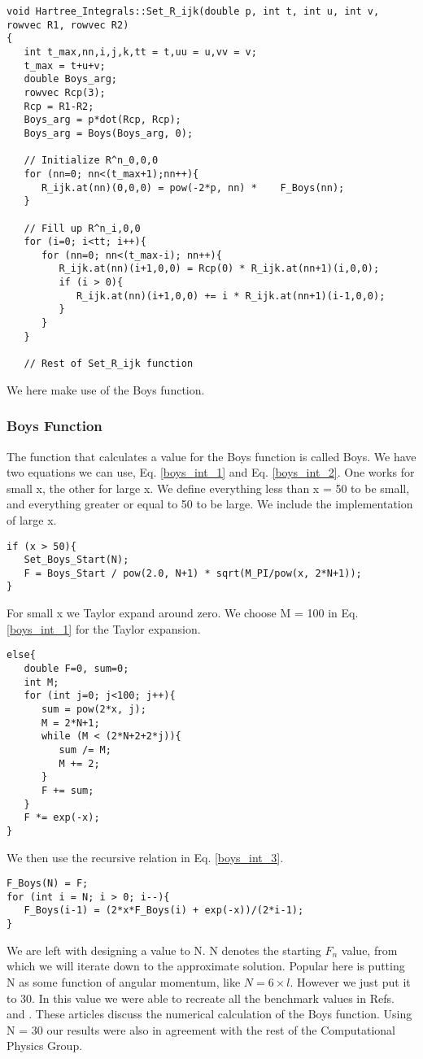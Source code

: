 \begin{lstlisting}
void Hartree_Integrals::Set_R_ijk(double p, int t, int u, int v, rowvec R1, rowvec R2)
{
   int t_max,nn,i,j,k,tt = t,uu = u,vv = v;
   t_max = t+u+v;
   double Boys_arg;
   rowvec Rcp(3);
   Rcp = R1-R2;
   Boys_arg = p*dot(Rcp, Rcp);
   Boys_arg = Boys(Boys_arg, 0);
   
   // Initialize R^n_0,0,0
   for (nn=0; nn<(t_max+1);nn++){
      R_ijk.at(nn)(0,0,0) = pow(-2*p, nn) *    F_Boys(nn);
   }

   // Fill up R^n_i,0,0
   for (i=0; i<tt; i++){
      for (nn=0; nn<(t_max-i); nn++){
         R_ijk.at(nn)(i+1,0,0) = Rcp(0) * R_ijk.at(nn+1)(i,0,0);
         if (i > 0){
            R_ijk.at(nn)(i+1,0,0) += i * R_ijk.at(nn+1)(i-1,0,0);
         }
      }
   }
   
   // Rest of Set_R_ijk function   
\end{lstlisting}
We here make use of the Boys function.

\subsubsection{Boys Function}
The function that calculates a value for the Boys function is called Boys. We have two equations we can use, Eq. \eqref{boys_int_1} and Eq. \eqref{boys_int_2}. One works for small x, the other for large x. We define everything less than x = 50 to be small, and everything greater or equal to 50 to be large. We include the implementation of large x. \\

\begin{lstlisting}
if (x > 50){
   Set_Boys_Start(N);
   F = Boys_Start / pow(2.0, N+1) * sqrt(M_PI/pow(x, 2*N+1));
}
\end{lstlisting}
For small x we Taylor expand around zero. We choose M = 100 in Eq. \eqref{boys_int_1} for the Taylor expansion. 

\begin{lstlisting}
else{
   double F=0, sum=0;
   int M;
   for (int j=0; j<100; j++){
      sum = pow(2*x, j);
      M = 2*N+1;
      while (M < (2*N+2+2*j)){
         sum /= M;
         M += 2;
      }
      F += sum;
   }
   F *= exp(-x);
}
\end{lstlisting}
We then use the recursive relation in Eq. \eqref{boys_int_3}. 

\begin{lstlisting}
F_Boys(N) = F;
for (int i = N; i > 0; i--){
   F_Boys(i-1) = (2*x*F_Boys(i) + exp(-x))/(2*i-1);
}
\end{lstlisting}
We are left with designing a value to N. N denotes the starting $F_n$ value, from which we will iterate down to the approximate solution. Popular here is putting N as some function of angular momentum, like $N = 6 \times l$. However we just put it to 30. In this value we were able to recreate all the benchmark values in Refs. \cite{boys_referanse_1} and \cite{boys_referanse_2}. These articles discuss the numerical calculation of the Boys function. Using N = 30 our results were also in agreement with the rest of the Computational Physics Group.

